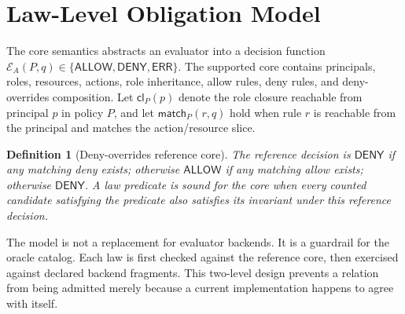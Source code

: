\documentclass[10pt,conference]{IEEEtran}
\newtheorem{definition}{Definition}
\newcommand{\Allow}{\mathsf{ALLOW}}
\newcommand{\Deny}{\mathsf{DENY}}
\newcommand{\Err}{\mathsf{ERR}}
\newcommand{\Eval}{\mathcal{E}}
\begin{document}
\section{Law-Level Obligation Model}
\label{sec:model}
The core semantics abstracts an evaluator into a decision function $\Eval_A(P,q)\in\{\Allow,\Deny,\Err\}$.  The supported core contains principals, roles, resources, actions, role inheritance, allow rules, deny rules, and deny-overrides composition.  Let $\mathsf{cl}_P(p)$ denote the role closure reachable from principal $p$ in policy $P$, and let $\mathsf{match}_P(r,q)$ hold when rule $r$ is reachable from the principal and matches the action/resource slice.

\begin{definition}[Deny-overrides reference core]
The reference decision is $\Deny$ if any matching deny exists; otherwise $\Allow$ if any matching allow exists; otherwise $\Deny$.  A law predicate is sound for the core when every counted candidate satisfying the predicate also satisfies its invariant under this reference decision.
\end{definition}

The model is not a replacement for evaluator backends.  It is a guardrail for the oracle catalog.  Each law is first checked against the reference core, then exercised against declared backend fragments.  This two-level design prevents a relation from being admitted merely because a current implementation happens to agree with itself.
\end{document}
